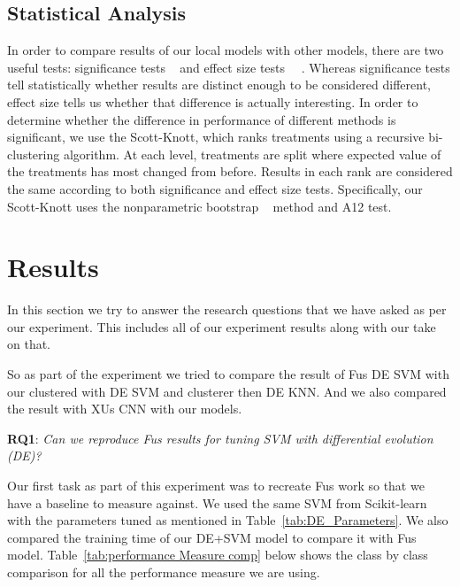 \documentclass[sigconf]{acmart}
\theoremstyle{break}
\begin{document}
    \subsection{Statistical Analysis}
    \label{sssec:Statistical Analysis}
    In order to compare results of our local models with other models, there are two useful tests: significance tests ~\cite{bentler1980significance} and effect size tests ~\cite{rosenthal1994parametric}~\cite{chen2002correlation}. Whereas significance tests tell statistically whether results are distinct enough to be considered different, effect size tells us whether that difference is actually interesting. In order to determine whether the difference in performance of different methods is significant, we use the Scott-Knott, which ranks treatments using a recursive bi-clustering algorithm. At each level, treatments are split where expected value of the treatments has most changed from before. Results in each rank are considered the same according to both significance and effect size tests. Specifically, our Scott-Knott uses the nonparametric bootstrap ~\cite{efron1982jackknife} method and A12 test.
    

\section{Results}
\label{sect:Result}
    In this section we try to answer the research questions that we have asked as per our experiment. This includes all of our experiment results along with our take on that. 
    
    So as part of the experiment we tried to compare the result of Fu\textquotesingle s DE SVM with our clustered with DE SVM  and clusterer then DE KNN. And we also compared the result with XU\textquotesingle s CNN with our models. 
    
    \textbf{RQ1}:  {\em Can we reproduce Fu\textquotesingle s results for tuning SVM with differential evolution (DE)?}
    
    Our first task as part of this experiment was to recreate Fu\textquotesingle s work so that we have a baseline to measure against. We used the same SVM from Scikit-learn with the parameters tuned as mentioned in Table~\ref{tab:DE_Parameters}. We also compared the training time of our DE+SVM model to compare it with Fu\textquotesingle s model. Table~\ref{tab:performance Measure comp} below shows the class by class comparison for all the performance measure we are using.
    
\end{document}
